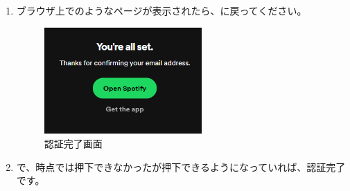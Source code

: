 \begin{enumerate}
                \newpage
                \item ブラウザ上でのようなページが表示されたら、\spotifydashboard に戻ってください。
                \label{item:spotify5}
                    \begin{figure}[htbp]
                        \centering
                        \includegraphics[width=6cm]{./pictures/Spotify4.png}
                        \caption{認証完了画面}
                        \label{img:spotify4}
                    \end{figure}
                \item \spotifydashboard で、時点では押下できなかったが押下できるようになっていれば、認証完了です。
            \end{enumerate}

        \newpage

